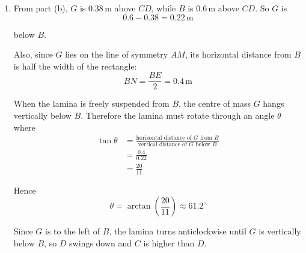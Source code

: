 \documentclass[leqno]{article}
\begin{document}
\begin{enumerate}[
  label=\textbf{\arabic*.},
  leftmargin=*,
  topsep=0pt,
  partopsep=0pt,
  parsep=0pt
]
\begin{djsSolution}
\begin{enumerate}[label=\textbf{(\alph*)}, start=1]
So the area of the triangle is
\[
\frac12 \times 0.8 \times 0.3 = 0.12\,\mathrm{m^2}
\]

The centre of mass of a uniform triangular lamina is \(\frac23\) of the way along a median from the vertex, so it is \(\frac13\) of the perpendicular height from the opposite side. So the triangle's centre of mass is
\[
0.6 + \frac{0.3}{3} = 0.7\,\mathrm{m}
\]

above \(CD\).

Let \(\bar y\) be the distance of \(G\) above \(CD\). The lamina is uniform, so areas can be used as weights. If piece \(i\) has area \(\mathcal{A}_i\) and its centre of mass is a distance \(y_i\) above \(CD\), then
\[
\mathcal{A}\bar y=\sum\mathcal{A}_iy_i
\]

where \(\mathcal{A}=\sum\mathcal{A}_i\).

So
\begin{align*}
(0.48+0.12)\bar y &= 0.48(0.3)+0.12(0.7) \\
0.6\bar y &= 0.144+0.084 \\
0.6\bar y &= 0.228 \\
\bar y &= 0.38\,\mathrm{m}
\end{align*}

So the perpendicular distance of \(G\) from \(CD\) is \(0.38\,\mathrm{m}\).

  \item From part (b), \(G\) is \(0.38\,\mathrm{m}\) above \(CD\), while \(B\) is \(0.6\,\mathrm{m}\) above \(CD\). So \(G\) is
\[
0.6-0.38=0.22\,\mathrm{m}
\]

below \(B\).

Also, since \(G\) lies on the line of symmetry \(AM\), its horizontal distance from \(B\) is half the width of the rectangle:
\[
BN=\frac{BE}{2}=0.4\,\mathrm{m}
\]

When the lamina is freely suspended from \(B\), the centre of mass \(G\) hangs vertically below \(B\). Therefore the lamina must rotate through an angle \(\theta\) where
\begin{align*}
\tan\theta &= \frac{\text{horizontal distance of }G\text{ from }B}{\text{vertical distance of }G\text{ below }B} \\
&= \frac{0.4}{0.22} \\
&= \frac{20}{11}
\end{align*}

Hence
\[
\theta = \arctan\left(\frac{20}{11}\right) \approx 61.2^\circ
\]

Since \(G\) is to the left of \(B\), the lamina turns anticlockwise until \(G\) is vertically below \(B\), so \(D\) swings down and \(C\) is higher than \(D\).


\end{enumerate}
\end{djsSolution}
\end{enumerate}
\end{document}
